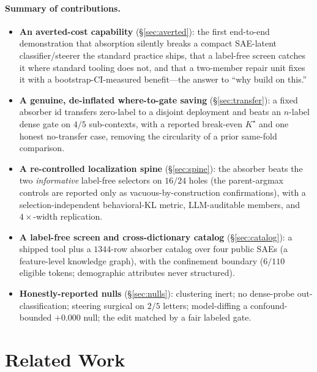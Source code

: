 \documentclass[11pt,letterpaper]{article}
\begin{document}
\paragraph{Summary of contributions.}
\begin{itemize}
\item \textbf{An averted-cost capability} (\S\ref{sec:averted}): the first end-to-end demonstration that absorption silently breaks a compact SAE-latent classifier/steerer the standard practice ships, that a label-free screen catches it where standard tooling does not, and that a two-member repair unit fixes it with a bootstrap-CI-measured benefit---the answer to ``why build on this.''
\item \textbf{A genuine, de-inflated where-to-gate saving} (\S\ref{sec:transfer}): a fixed absorber id transfers zero-label to a disjoint deployment and beats an $n$-label dense gate on $4/5$ sub-contexts, with a reported break-even $K^\star$ and one honest no-transfer case, removing the circularity of a prior same-fold comparison.
\item \textbf{A re-controlled localization spine} (\S\ref{sec:spine}): the absorber beats the two \emph{informative} label-free selectors on $16/24$ holes (the parent-argmax controls are reported only as vacuous-by-construction confirmations), with a selection-independent behavioral-KL metric, LLM-auditable members, and $4\times$-width replication.
\item \textbf{A label-free screen and cross-dictionary catalog} (\S\ref{sec:catalog}): a shipped tool plus a $1344$-row absorber catalog over four public SAEs (a feature-level knowledge graph), with the confinement boundary ($6/110$ eligible tokens; demographic attributes never structured).
\item \textbf{Honestly-reported nulls} (\S\ref{sec:nulls}): clustering inert; no dense-probe out-classification; steering surgical on $2/5$ letters; model-diffing a confound-bounded $+0.000$ null; the edit matched by a fair labeled gate.
\end{itemize}

\section{Related Work}
\label{sec:related}
\end{document}
